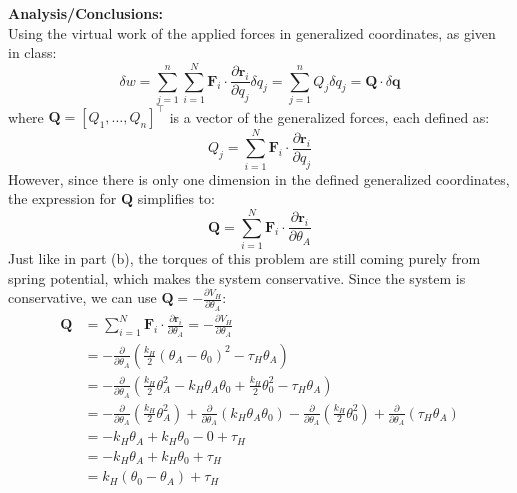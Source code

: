 \documentclass[titlepage]{article}
\begin{document}
\textbf{Analysis/Conclusions:}\\
Using the virtual work of the applied forces in generalized coordinates, as given in class:
\begin{equation}
	\delta w=\sum_{j=1}^{n}\sum_{i=1}^{N}\boldsymbol{F}_i\cdot\frac{\partial\boldsymbol{r}_i}{\partial q_j}\delta q_j=\sum_{j=1}^{n}Q_j\delta q_j=\boldsymbol{Q}\cdot\delta\boldsymbol{q}
\end{equation}
where $\boldsymbol{Q}=[Q_1,\ldots,Q_n]^\top$ is a vector of the generalized forces, each defined as:
\begin{equation}
	Q_j=\sum_{i=1}^{N}\boldsymbol{F}_i\cdot\frac{\partial\boldsymbol{r}_i}{\partial q_j}
	\label{eq:c2genforce}
\end{equation}
However, since there is only one dimension in the defined generalized coordinates, the expression for $\boldsymbol{Q}$ simplifies to:
\begin{equation}
	\boldsymbol{Q}=\sum_{i=1}^{N}\boldsymbol{F}_i\cdot\frac{\partial\boldsymbol{r}_i}{\partial \theta_A}
\end{equation}
Just like in part (b), the torques of this problem are still coming purely from spring potential, which makes the system conservative. Since the system is conservative, we can use $\boldsymbol{Q}=-\frac{\partial V_H}{\partial\theta_A}$:
\begin{equation}
	\begin{split}
		\boldsymbol{Q}&=\sum_{i=1}^{N}\boldsymbol{F}_i\cdot\frac{\partial\boldsymbol{r}_i}{\partial \theta_A}=-\frac{\partial V_H}{\partial\theta_A} \\
		&=-\frac{\partial}{\partial\theta_A}\left(\frac{k_H}{2}(\theta_A-\theta_0)^2-\tau_H\theta_A\right) \\
		&=-\frac{\partial}{\partial\theta_A}\left(\frac{k_H}{2}\theta_A^2-k_H\theta_A\theta_0+\frac{k_H}{2}\theta_0^2-\tau_H\theta_A\right) \\
		&=-\frac{\partial}{\partial\theta_A}\left(\frac{k_H}{2}\theta_A^2\right)+\frac{\partial}{\partial\theta_A}\left(k_H\theta_A\theta_0\right)-\frac{\partial}{\partial\theta_A}\left(\frac{k_H}{2}\theta_0^2\right)+\frac{\partial}{\partial\theta_A}\left(\tau_H\theta_A\right) \\
		&=-k_H\theta_A+k_H\theta_0-0+\tau_H \\
		&=-k_H\theta_A+k_H\theta_0+\tau_H \\
		&=k_H(\theta_0-\theta_A)+\tau_H
	\end{split}
\end{equation}
\end{document}
